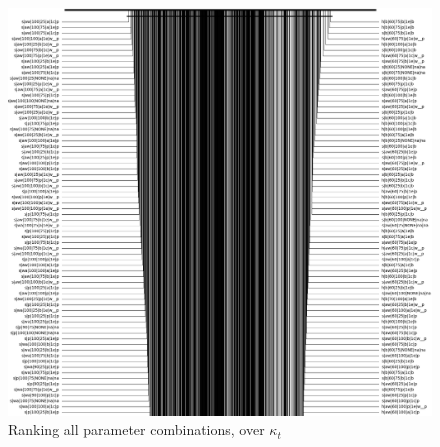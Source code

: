 \begin{figure}
  \includegraphics[width=\linewidth]{./images/chapter5/rank_kappa_cropped}
\caption{\label{fig:rank_kappa}Ranking all parameter combinations, over $\kappa_t$}
\end{figure}
